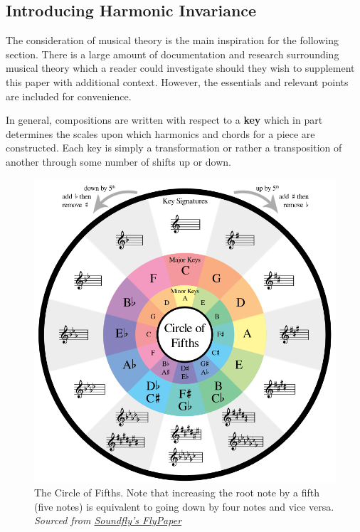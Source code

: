 \documentclass[12pt,]{article}
\begin{document}
\hypertarget{introducing-harmonic-invariance}{%
\subsection{Introducing Harmonic
Invariance}\label{introducing-harmonic-invariance}}

The consideration of musical theory is the main inspiration for the
following section. There is a large amount of documentation and research
surrounding musical theory which a reader could investigate should they
wish to supplement this paper with additional context. However, the
essentials and relevant points are included for convenience.

In general, compositions are written with respect to a \textbf{key}
which in part determines the scales upon which harmonics and chords for
a piece are constructed. Each key is simply a transformation or rather a
transposition of another through some number of shifts up or down.

\vspace{35px}

\begin{figure}
\centering
\includegraphics[width=\textwidth,height=0.4\textheight]{Images/flypaperfifths.png}
\caption{The Circle of Fifths. Note that increasing the root note by a
fifth (five notes) is equivalent to going down by four notes and vice
versa.
\newline\textit{Sourced from \href{https://flypaper.soundfly.com/write/how-the-circle-of-fifths-can-help-your-songwriting/}{Soundfly's FlyPaper}}}
\end{figure}
\end{document}
